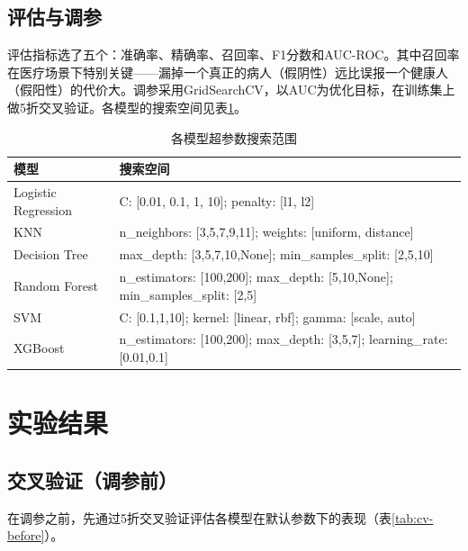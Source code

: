 \documentclass[12pt,a4paper]{ctexart}
\begin{document}
\subsection{评估与调参}

评估指标选了五个：准确率、精确率、召回率、F1分数和AUC-ROC。其中召回率在医疗场景下特别关键——漏掉一个真正的病人（假阴性）远比误报一个健康人（假阳性）的代价大。调参采用GridSearchCV，以AUC为优化目标，在训练集上做5折交叉验证。各模型的搜索空间见表\ref{tab:param-grid}。

\begin{table}[H]
\centering
\caption{各模型超参数搜索范围}
\label{tab:param-grid}
\small
\begin{tabular}{ll}
\toprule
\textbf{模型} & \textbf{搜索空间} \\
\midrule
Logistic Regression & C: [0.01, 0.1, 1, 10]; penalty: [l1, l2] \\
KNN & n\_neighbors: [3,5,7,9,11]; weights: [uniform, distance] \\
Decision Tree & max\_depth: [3,5,7,10,None]; min\_samples\_split: [2,5,10] \\
Random Forest & n\_estimators: [100,200]; max\_depth: [5,10,None]; min\_samples\_split: [2,5] \\
SVM & C: [0.1,1,10]; kernel: [linear, rbf]; gamma: [scale, auto] \\
XGBoost & n\_estimators: [100,200]; max\_depth: [3,5,7]; learning\_rate: [0.01,0.1] \\
\bottomrule
\end{tabular}
\end{table}

\section{实验结果}

\subsection{交叉验证（调参前）}

在调参之前，先通过5折交叉验证评估各模型在默认参数下的表现（表\ref{tab:cv-before}）。
\end{document}
